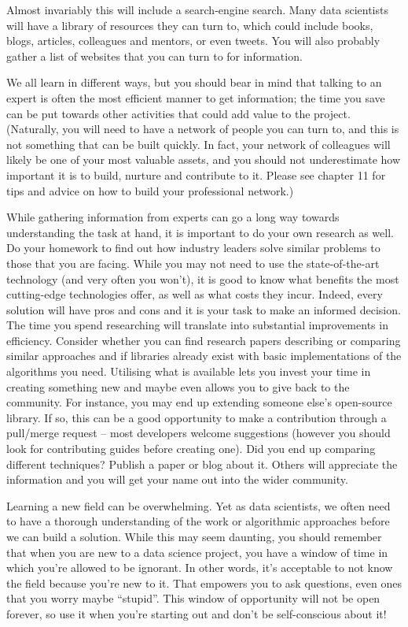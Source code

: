 \documentclass[
]{book}
\begin{document}
Almost invariably this will include a search-engine search. Many data scientists will have a library of resources they can turn to, which could include books, blogs, articles, colleagues and mentors, or even tweets. You will also probably gather a list of websites that you can turn to for information.

We all learn in different ways, but you should bear in mind that talking to an expert is often the most efficient manner to get information; the time you save can be put towards other activities that could add value to the project. (Naturally, you will need to have a network of people you can turn to, and this is not something that can be built quickly. In fact, your network of colleagues will likely be one of your most valuable assets, and you should not underestimate how important it is to build, nurture and contribute to it. Please see chapter 11 for tips and advice on how to build your professional network.)

While gathering information from experts can go a long way towards understanding the task at hand, it is important to do your own research as well. Do your homework to find out how industry leaders solve similar problems to those that you are facing. While you may not need to use the state-of-the-art technology (and very often you won't), it is good to know what benefits the most cutting-edge technologies offer, as well as what costs they incur. Indeed, every solution will have pros and cons and it is your task to make an informed decision. The time you spend researching will translate into substantial improvements in efficiency. Consider whether you can find research papers describing or comparing similar approaches and if libraries already exist with basic implementations of the algorithms you need. Utilising what is available lets you invest your time in creating something new and maybe even allows you to give back to the community. For instance, you may end up extending someone else's open-source library. If so, this can be a good opportunity to make a contribution through a pull/merge request -- most developers welcome suggestions (however you should look for contributing guides before creating one). Did you end up comparing different techniques? Publish a paper or blog about it. Others will appreciate the information and you will get your name out into the wider community.

Learning a new field can be overwhelming. Yet as data scientists, we often need to have a thorough understanding of the work or algorithmic approaches before we can build a solution. While this may seem daunting, you should remember that when you are new to a data science project, you have a window of time in which you're allowed to be ignorant. In other words, it's acceptable to not know the field because you're new to it. That empowers you to ask questions, even ones that you worry maybe ``stupid''. This window of opportunity will not be open forever, so use it when you're starting out and don't be self-conscious about it!
\end{document}
